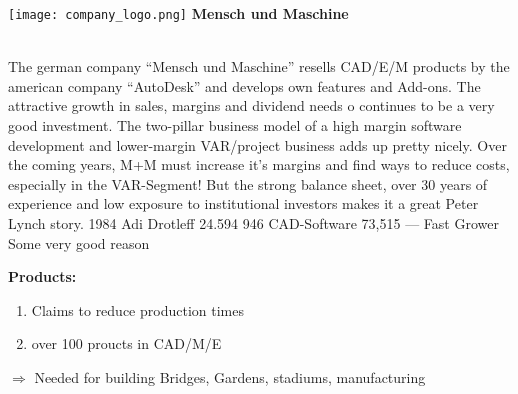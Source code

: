 \documentclass{company_analysis}
\begin{document}
\begin{minipage}{\textwidth}
    \center\texttt{[image: company\_logo.png]}
    {\textbf{Mensch und Maschine}}
\end{minipage}\\



\story
    {The german company \enquote{Mensch und Maschine} resells CAD/E/M
    products by the american company \enquote{AutoDesk} and develops
    own features and Add-ons. The attractive growth in sales, margins
    and dividend needs o continues to be a very good investment. The
    two-pillar business model of a high margin software development and
    lower-margin VAR/project business adds up pretty nicely. Over the
    coming years, M+M must increase it's margins and find ways to reduce
    costs, especially in the VAR-Segment! But the strong balance sheet,
    over 30 years of experience and low exposure to institutional investors
    makes it a great Peter Lynch story.}
\infosection
    {1984}
    {Adi Drotleff}
    {24.594}
    {946}
    {CAD-Software}
    {73,515}
    {---}
    {Fast Grower}
    {Some very good reason}



    \begin{minipage}{.6\linewidth}
        \faArchive\space\textbf{Products:}
        \begin{enumerate}
            \item Claims to reduce production times
            \item over 100 proucts in CAD/M/E
        \end{enumerate}
        $\Rightarrow$ Needed for building Bridges, Gardens, stadiums, manufacturing
    \end{minipage}
    \begin{minipage}{.4\linewidth}
        \centering
    \end{minipage}
\end{document}
